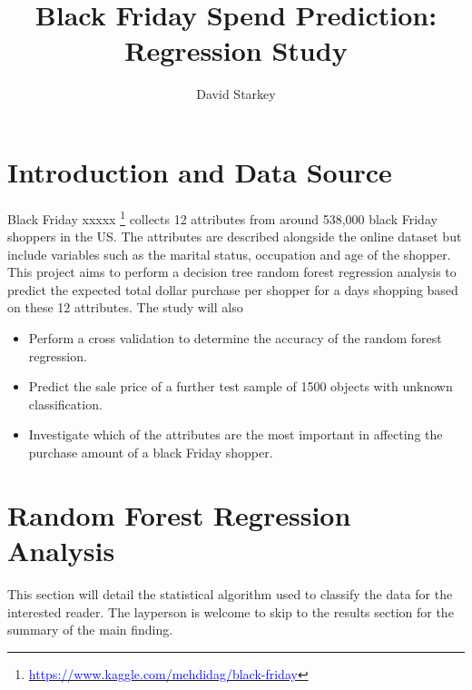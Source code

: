 \documentclass[10pt]{article}
\begin{document}
\title{Black Friday Spend Prediction: Regression Study}

\author{David Starkey}

\maketitle





\section{Introduction and Data Source}



Black Friday xxxxx \footnote{\href{ https://www.kaggle.com/mehdidag/black-friday}{\textcolor{blue}{https://www.kaggle.com/mehdidag/black-friday}}} collects 12 attributes from around 538,000 black Friday shoppers in the US. The attributes are described alongside the online dataset but include variables such as the marital status, occupation and age of the shopper. This project aims to perform a decision tree random forest regression analysis to predict the expected total dollar purchase per shopper for a days shopping based on these 12 attributes. The study will also

\begin{itemize}
\item Perform a cross validation to determine the accuracy of the random forest regression.

\item Predict the sale price of a further test sample of 1500 objects with unknown classification.

\item Investigate which of the attributes are the most important in affecting the purchase amount of a black Friday shopper.

\end{itemize}







\section{Random Forest Regression Analysis}
\label{sec_rf}
This section will detail the statistical algorithm used to classify the data for the interested reader. The layperson is welcome to skip to the results section for the summary of the main finding.
\end{document}
